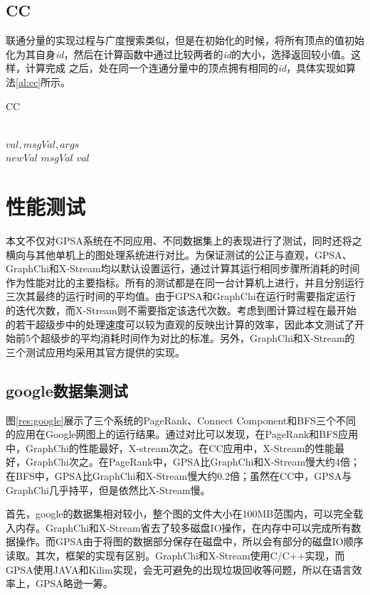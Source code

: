 \subsection{CC}
联通分量的实现过程与广度搜索类似，但是在初始化的时候，将所有顶点的值初始化为其自身\textit{id}，然后在计算函数中通过比较两者的\textit{id}的大小，选择返回较小值。这样，计算完成
之后，处在同一个连通分量中的顶点拥有相同的\textit{id}，具体实现如算法\ref{al:cc}所示。
\begin{algorithm}
{
{
\renewcommand\baselinestretch{1.5}\selectfont %

\caption{CC}
\label{al:cc}
\begin{algorithmic}[1]
\REQUIRE ~\\
	$val,msgVal,args$
\ENSURE ~\\
	$newVal$
	 \RETURN $ msgVal$
\ENDIF
\RETURN $val$

\end{algorithmic}
}
\par}
\end{algorithm}

\section{性能测试}
本文不仅对GPSA系统在不同应用、不同数据集上的表现进行了测试，同时还将之横向与其他单机上的图处理系统进行对比。为保证测试的公正与直观，GPSA、GraphChi和X-Stream均以默认设置运行，通过计算其运行相同步骤所消耗的时间作为性能对比的主要指标。所有的测试都是在同一台计算机上进行，并且分别运行三次其最终的运行时间的平均值。由于GPSA和GraphChi在运行时需要指定运行的迭代次数，而X-Stream则不需要指定该迭代次数。考虑到图计算过程在最开始的若干超级步中的处理速度可以较为直观的反映出计算的效率，因此本文测试了开始前5个超级步的平均消耗时间作为对比的标准。另外，GraphChi和X-Stream的三个测试应用均采用其官方提供的实现。

\subsection{google数据集测试}
图\ref{res:google}展示了三个系统的PageRank、Connect Component和BFS三个不同的应用在Google网图上的运行结果。通过对比可以发现，在PageRank和BFS应用中，GraphChi的性能最好，X-stream次之。在CC应用中，X-Stream的性能最好，GraphChi次之。在PageRank中，GPSA比GraphChi和X-Stream慢大约4倍；在BFS中，GPSA比GraphChi和X-Stream慢大约0.2倍；虽然在CC中，GPSA与GraphChi几乎持平，但是依然比X-Stream慢。

首先，google的数据集相对较小，整个图的文件大小在100MB范围内，可以完全载入内存。GraphChi和X-Stream省去了较多磁盘IO操作，在内存中可以完成所有数据操作。而GPSA由于将图的数据部分保存在磁盘中，所以会有部分的磁盘IO顺序读取。其次，框架的实现有区别。GraphChi和X-Stream使用C/C++实现，而GPSA使用JAVA和Kilim实现，会无可避免的出现垃圾回收等问题，所以在语言效率上，GPSA略逊一筹。

